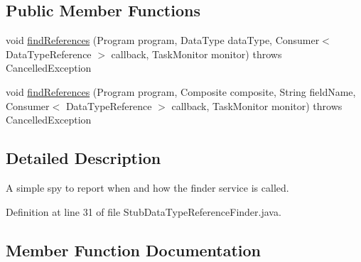 \subsection*{Public Member Functions}
\begin{DoxyCompactItemize}
\item 
void \mbox{\hyperlink{classghidra_1_1app_1_1plugin_1_1core_1_1decompile_1_1_stub_data_type_reference_finder_a39c40979d2125365c0eb577c72a8e0d3}{find\+References}} (Program program, Data\+Type data\+Type, Consumer$<$ Data\+Type\+Reference $>$ callback, Task\+Monitor monitor)  throws Cancelled\+Exception 
\item 
void \mbox{\hyperlink{classghidra_1_1app_1_1plugin_1_1core_1_1decompile_1_1_stub_data_type_reference_finder_ae0ee53ae792a4d02e338dbec3a508053}{find\+References}} (Program program, Composite composite, String field\+Name, Consumer$<$ Data\+Type\+Reference $>$ callback, Task\+Monitor monitor)  throws Cancelled\+Exception 
\end{DoxyCompactItemize}


\subsection{Detailed Description}
A simple spy to report when and how the finder service is called. 

Definition at line 31 of file Stub\+Data\+Type\+Reference\+Finder.\+java.



\subsection{Member Function Documentation}
\mbox{\label{classghidra_1_1app_1_1plugin_1_1core_1_1decompile_1_1_stub_data_type_reference_finder_a39c40979d2125365c0eb577c72a8e0d3}} 
